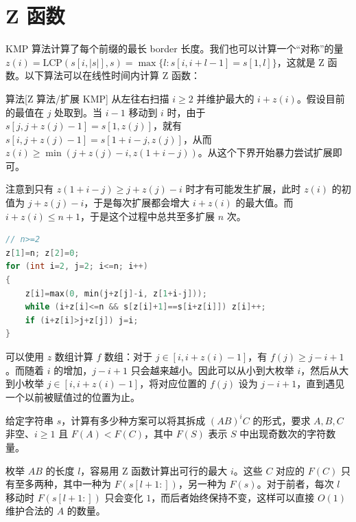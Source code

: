 \section{Z 函数}

KMP 算法计算了每个前缀的最长 border 长度。我们也可以计算一个“对称”的量 $z(i)=\mathrm{LCP}(s[i,|s|],s)=\max\{l:s[i,i+l-1]=s[1,l]\}$，这就是 Z 函数。以下算法可以在线性时间内计算 Z 函数：
\begin{descbox}{算法}[Z 算法/扩展 KMP]
    从左往右扫描 $i\ge 2$ 并维护最大的 $i+z(i)$。假设目前的最值在 $j$ 处取到。当 $i-1$ 移动到 $i$ 时，由于 $s[j,j+z(j)-1]=s[1,z(j)]$，就有 $s[i,j+z(j)-1]=s[1+i-j,z(j)]$，从而 $z(i)\ge \min(j+z(j)-i,z(1+i-j))$。从这个下界开始暴力尝试扩展即可。 

    注意到只有 $z(1+i-j)\ge j+z(j)-i$ 时才有可能发生扩展，此时 $z(i)$ 的初值为 $j+z(j)-i$，于是每次扩展都会增大 $i+z(i)$ 的最大值。而 $i+z(i)\le n+1$，于是这个过程中总共至多扩展 $n$ 次。 
\end{descbox}
\begin{lstlisting}[language=C++]
// n>=2
z[1]=n; z[2]=0;
for (int i=2, j=2; i<=n; i++) 
{
    z[i]=max(0, min(j+z[j]-i, z[1+i-j]));
    while (i+z[i]<=n && s[z[i]+1]==s[i+z[i]]) z[i]++;
    if (i+z[i]>j+z[j]) j=i;
}
\end{lstlisting} 

可以使用 $z$ 数组计算 $f$ 数组：对于 $j\in [i,i+z(i)-1]$，有 $f(j)\ge j-i+1$。而随着 $i$ 的增加，$j-i+1$ 只会越来越小。因此可以从小到大枚举 $i$，然后从大到小枚举 $j\in [i,i+z(i)-1]$，将对应位置的 $f(j)$ 设为 $j-i+1$，直到遇见一个以前被赋值过的位置为止。

\begin{exercise}[{[NOIP2020] 字符串匹配}]
    给定字符串 $s$，计算有多少种方案可以将其拆成 $(AB)^iC$ 的形式，要求 $A,B,C$ 非空、$i\ge 1$ 且 $F(A)<F(C)$，其中 $F(S)$ 表示 $S$ 中出现奇数次的字符数量。
\end{exercise}
\begin{solution}
    枚举 $AB$ 的长度 $l$，容易用 Z 函数计算出可行的最大 $i$。这些 $C$ 对应的 $F(C)$ 只有至多两种，其中一种为 $F(s[l+1:])$，另一种为 $F(s)$。对于前者，每次 $l$ 移动时 $F(s[l+1:])$ 只会变化 $1$，而后者始终保持不变，这样可以直接 $O(1)$ 维护合法的 $A$ 的数量。
\end{solution}



